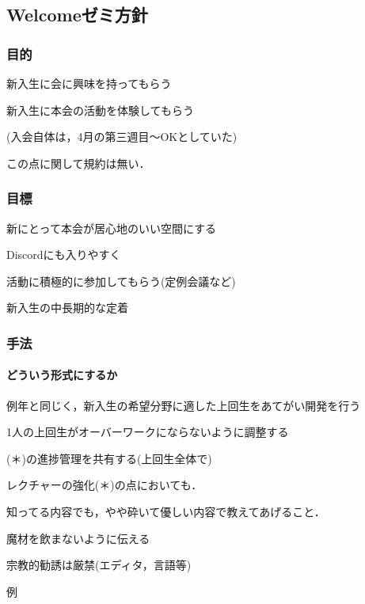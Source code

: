\subsection*{Welcomeゼミ方針}


\subsubsection*{目的}
新入生に会に興味を持ってもらう

新入生に本会の活動を体験してもらう

(入会自体は，4月の第三週目～OKとしていた)

この点に関して規約は無い．

\subsubsection*{目標}
新\firstGrade{}にとって本会が居心地のいい空間にする

Discordにも入りやすく

活動に積極的に参加してもらう(定例会議など)

新入生の中長期的な定着


\subsubsection*{手法}
\paragraph*{どういう形式にするか}
        例年と同じく，新入生の希望分野に適した上回生をあてがい開発を行う
        
        1人の上回生がオーバーワークにならないように調整する
        
        (＊)\firstGrade{}の進捗管理を共有する(上回生全体で)
        
        レクチャーの強化(＊)の点においても．
        
        知ってる内容でも，やや砕いて優しい内容で教えてあげること．
        
        魔材を飲まないように伝える
        
        宗教的勧誘は厳禁(エディタ，言語等)
        
            例
            
